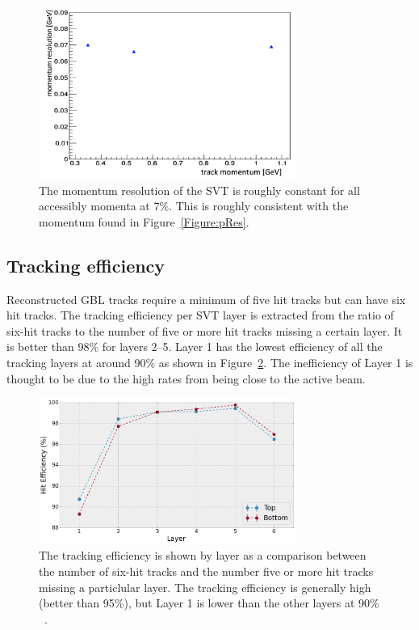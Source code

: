 \begin{figure}[thb]
  \centering
      \includegraphics[width=0.75\textwidth]{pics/performance/pResExtrapolated.png}
  \caption[Momentum resolution of the SVT extracted from $E/P$]{The momentum resolution of the SVT is roughly constant for all accessibly momenta at 7$\%$. This is roughly consistent with the momentum found in Figure~\ref{Figure:pRes}.}
  \label{Figure:pResExtrap}
\end{figure}

\subsection{Tracking efficiency}

Reconstructed GBL tracks require a minimum of five hit tracks but can have six hit tracks. The tracking efficiency per SVT layer is extracted from the ratio of six-hit tracks to the number of five or more hit tracks missing a certain layer. It is better than 98$\%$ for layers 2--5. Layer 1 has the lowest efficiency of all the tracking layers at around 90$\%$ as shown in Figure~\ref{Figure:trackEff}. The inefficiency of Layer 1 is thought to be due to the high rates from being close to the active beam. 

\begin{figure}[thb]
  \centering
      \includegraphics[width=0.75\textwidth]{pics/performance/engrun2015_hit_efficiency_vs_layer.png}
  \caption[Tracking efficiency of the SVT by layer]{The tracking efficiency is shown by layer as a comparison between the number of six-hit tracks and the number five or more hit tracks missing a particlular layer. The tracking efficiency is generally high (better than 95$\%$), but Layer 1 is lower than the other layers at  90$\%$~\cite{moreno_search_2016}.}
  \label{Figure:trackEff}
\end{figure}

